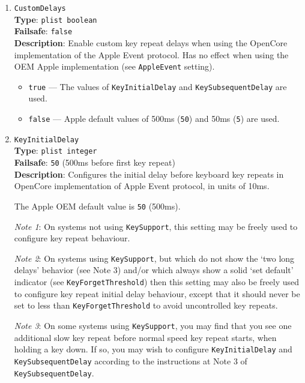 \documentclass[]{article}
\providecommand{\tightlist}{%
  \setlength{\itemsep}{0pt}\setlength{\parskip}{0pt}}
\begin{document}
\begin{enumerate}
\item
  \texttt{CustomDelays}\\
  \textbf{Type}: \texttt{plist\ boolean}\\
  \textbf{Failsafe}: \texttt{false}\\
  \textbf{Description}: Enable custom key repeat delays when using the OpenCore implementation of the Apple Event protocol.
  Has no effect when using the OEM Apple implementation (see \texttt{AppleEvent} setting).

  \begin{itemize}
  \tightlist
  \item \texttt{true} --- The values of \texttt{KeyInitialDelay} and \texttt{KeySubsequentDelay} are used.
  \item \texttt{false} --- Apple default values of 500ms (\texttt{50}) and 50ms (\texttt{5}) are used.
  \end{itemize}

\item
  \texttt{KeyInitialDelay}\\
  \textbf{Type}: \texttt{plist\ integer}\\
  \textbf{Failsafe}: \texttt{50} (500ms before first key repeat)\\
  \textbf{Description}: Configures the initial delay before keyboard key repeats in OpenCore implementation
  of Apple Event protocol, in units of 10ms.

  The Apple OEM default value is \texttt{50} (500ms).

  \emph{Note 1}: On systems not using \texttt{KeySupport}, this setting may be freely used
  to configure key repeat behaviour.

  \emph{Note 2}: On systems using \texttt{KeySupport}, but which do not show the `two long
  delays' behavior (see Note 3) and/or which always show a solid `set default' indicator (see \texttt{KeyForgetThreshold})
  then this setting may also be freely used to configure key repeat initial delay behaviour,
  except that it should never be set to less than \texttt{KeyForgetThreshold} to avoid
  uncontrolled key repeats.

  \emph{Note 3}: On some systems using \texttt{KeySupport}, you may find that you see
  one additional slow key repeat before normal speed key repeat starts, when holding a
  key down. If so, you may wish to configure \texttt{KeyInitialDelay} and \texttt{KeySubsequentDelay}
  according to the instructions at Note 3 of \texttt{KeySubsequentDelay}.



\end{enumerate}
\end{document}
